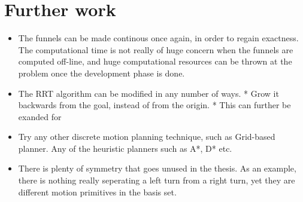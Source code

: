 \chapter{Further work}

\begin{itemize}
  \item The funnels can be made continous once again, in order to regain
    exactness. The computational time is not really of huge concern when the
    funnels are computed off-line, and huge computational resources can be
    thrown at the problem once the development phase is done.
  \item The RRT algorithm can be modified in any number of ways.
    * Grow it backwards from the goal, instead of from the origin.
    * This can further be exanded for 

  \item Try any other discrete motion planning technique, such as Grid-based
    planner. Any of the heuristic planners such as A*, D* etc.

  \item There is plenty of symmetry that goes unused in the thesis. As an
    example, there is nothing really seperating a left turn from a right turn,
    yet they are different motion primitives in the basis set.
\end{itemize}